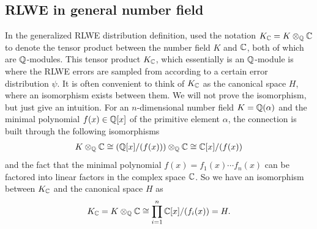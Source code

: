 \documentclass[../main.tex]{subfiles}
\begin{document}
\subsection{RLWE in general number field}

In the generalized RLWE distribution definition, \cite{lyubashevsky2010ideal} used the notation $K_{\mathbb{C}} = K \otimes_{\mathbb{Q}} \mathbb{C}$ to denote the tensor product between the number field $K$ and $\mathbb{C}$, both of which are $\mathbb{Q}$-modules. %
This tensor product $K_{\mathbb{C}}$, which essentially is an $\mathbb{Q}$-module is where the RLWE errors are sampled from according to a certain error distribution $\psi$. It is often convenient to think of $K_{\mathbb{C}}$ as the canonical space $H$, where an isomorphism exists between them. We will not prove the isomorphism, but just give an intuition. For an $n$-dimensional number field $K=\mathbb{Q}(\alpha)$ and the minimal polynomial $f(x) \in \mathbb{Q}[x]$ of the primitive element $\alpha$, the connection is built through the following isomorphisms 
\begin{align*}
    K \otimes_{\mathbb{Q}} \mathbb{C} \cong \left( \mathbb{Q}[x]/(f(x)) \right) \otimes_{\mathbb{Q}} \mathbb{C} \cong \mathbb{C}[x] / (f(x))
\end{align*}
and the fact that the minimal polynomial $f(x)=f_1(x) \cdots f_n(x)$ can be factored into linear factors in the complex space $\mathbb{C}$. So we have an isomorphism between $K_{\mathbb{C}}$ and the canonical space $H$ as 
\begin{align*}
    K_{\mathbb{C}} = K \otimes_{\mathbb{Q}} \mathbb{C} \cong \prod_{i=1}^n \mathbb{C}[x]/(f_i(x))=H.
\end{align*}
\end{document}
